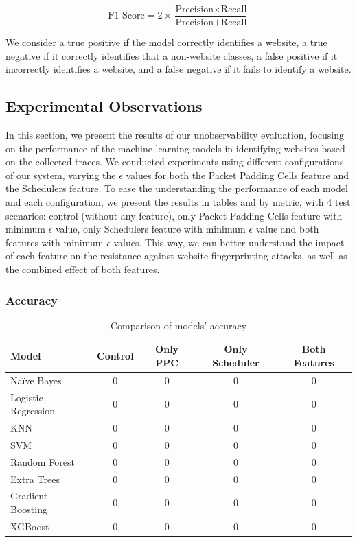 \[
\text{F1-Score} = 2 \times \frac{\text{Precision} \times \text{Recall}}{\text{Precision} + \text{Recall}}
\]


We consider a true positive if the model correctly identifies a website, a true negative if it correctly identifies that a non-website classes, a false positive if it incorrectly identifies a website, and a false negative if it fails to identify a website. 

\subsection{Experimental Observations}\label{sec:experimental_observations_unobservability}

In this section, we present the results of our unobservability evaluation, focusing on the performance of the machine learning models in identifying websites based on the collected traces. We conducted experiments using different configurations of our system, varying the $\epsilon$ values for both the Packet Padding Cells feature and the Schedulers feature. To ease the understanding the performance of each model and each configuration, we present the results in tables and by metric, with 4 test scenarios: control (without any feature), only Packet Padding Cells feature with minimum $\epsilon$ value, only Schedulers feature with minimum $\epsilon$ value and both features with minimum $\epsilon$ values. This way, we can better understand the impact of each feature on the resistance against website fingerprinting attacks, as well as the combined effect of both features.

\subsubsection{Accuracy}

\begin{table}[h!]
    \centering
    \begin{tabular}{lcccc}
        \toprule
        \textbf{Model} & \textbf{Control} & \textbf{Only PPC} & \textbf{Only Scheduler} & \textbf{Both Features} \\
        \midrule
        Naïve Bayes        & 0 & 0 & 0 & 0 \\
        Logistic Regression & 0 & 0 & 0 & 0 \\
        KNN                 & 0 & 0 & 0 & 0 \\
        SVM                 & 0 & 0 & 0 & 0 \\
        Random Forest       & 0 & 0 & 0 & 0 \\
        Extra Trees         & 0 & 0 & 0 & 0 \\
        Gradient Boosting   & 0 & 0 & 0 & 0 \\
        XGBoost             & 0 & 0 & 0 & 0 \\
        \bottomrule
    \end{tabular}
    \caption{Comparison of models' accuracy}\label{tab:models_accuracy_comparison}
\end{table}



